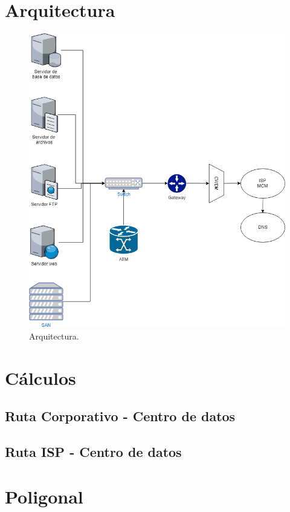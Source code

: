 \documentclass[12pt,letterpaper]{article}
\begin{document}

\newpage
\section{Arquitectura}
\begin{figure}[ht]
    \centering
    \includegraphics[width=.75\textwidth]{f16.png}
    \caption{Arquitectura.}
\end{figure}

\newpage
\section{Cálculos}
\subsection{Ruta Corporativo - Centro de datos}

\subsection{Ruta ISP - Centro de datos}

\newpage
\section{Poligonal}
\end{document}
